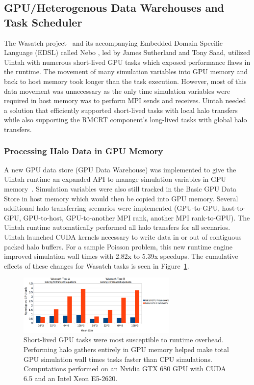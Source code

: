 \documentclass[12pt]{article}
\begin{document}
\subsection{GPU/Heterogenous Data Warehouses and Task Scheduler}
\label{ch:data warehouses}

The Wasatch project~\cite{wasatch-2015} and its accompanying Embedded Domain Specific Language (EDSL) called Nebo \cite{nebo_2015, sutherland_discrete_2011}, led by James Sutherland and Tony Saad, utilized Uintah with numerous short-lived GPU tasks which exposed performance flaws in the runtime.  The movement of many simulation variables into GPU memory and back to host memory took longer than the task execution.  However, most of this data movement was unnecessary as the only time simulation variables were required in host memory was to perform MPI sends and receives.  Uintah needed a solution that efficiently supported short-lived tasks with local halo transfers while also supporting the RMCRT component's long-lived tasks with global halo transfers.




\subsubsection{Processing Halo Data in GPU Memory}
\label{ch:processing_halo_data_gpu_memory}



A new GPU data store (GPU Data Warehouse) was implemented to give the Uintah runtime an expanded API to manage simulation variables in GPU memory~\cite{wolfhpc15}.  Simulation variables were also still tracked in the Basic GPU Data Store in host memory which would then be copied into GPU memory.  Several additional halo transferring scenarios were implemented (GPU-to-GPU, host-to-GPU, GPU-to-host, GPU-to-another MPI rank, another MPI rank-to-GPU). The Uintah runtime automatically performed all halo transfers for all scenarios.   Uintah launched CUDA kernels necessary to write data in or out of contiguous packed halo buffers.  For a sample Poisson problem, this new runtime engine improved simulation wall times with 2.82x to 5.39x speedups.   The cumulative effects of these changes for Wasatch tasks is seen in Figure~\ref{fig:wasatch-speedups}.  

\begin{figure}
	\centering
	\includegraphics[width=0.70\textwidth]{figures/wasatch_test_bar_chart-highquality.png}
	\caption{Short-lived GPU tasks were most susceptible to runtime overhead.  Performing halo gathers entirely in GPU memory helped make total GPU simulation wall times tasks faster than CPU simulations.  Computations performed on an Nvidia GTX 680 GPU with CUDA 6.5 and an Intel Xeon E5-2620.}
	\label{fig:wasatch-speedups}
\end{figure}
\end{document}
